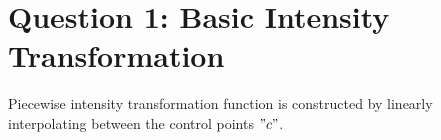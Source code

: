 \documentclass[11pt]{article}
\begin{document}


    




    




\section*{Question 1: Basic Intensity Transformation}
Piecewise intensity transformation function is constructed by linearly interpolating between the control points $"c"$.
\end{document}
